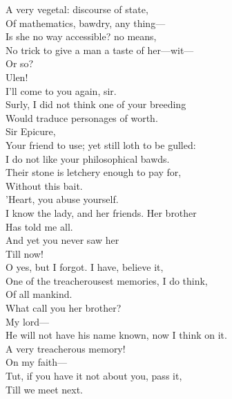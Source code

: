 \documentclass[a4paper,oneside,12pt]{memoir}
\begin{document}
\begin{drama*}
A very vegetal: discourse of state,\\
Of mathematics, bawdry, any thing---\\
\mammonspeaks Is she no way accessible? no means,\\
No trick to give a man a taste of her---wit---\\
Or so?\\
\subtlespeaks {}  Ulen!\\
\facespeaks {} I'll come to you again, sir.\\
\mammonspeaks Surly, I did not think one of your breeding\\
Would traduce personages of worth.\\
\surlyspeaks {} Sir Epicure,\\
Your friend to use; yet still loth to be gulled:\\
I do not like your philosophical bawds.\\
Their stone is letchery enough to pay for,\\
Without this bait.\\
\mammonspeaks {} 'Heart, you abuse yourself.\\
I know the lady, and her friends. Her brother\\
Has told me all.\\
\surlyspeaks {} And yet you never saw her\\
Till now!\\
\mammonspeaks {} O yes, but I forgot. I have, believe it,\\
One of the treacherousest memories, I do think,\\
Of all mankind.\\
\surlyspeaks {} What call you her brother?\\
\mammonspeaks {} My lord---\\
He will not have his name known, now I think on it.\\
\surlyspeaks A very treacherous memory!\\
\mammonspeaks {} On my faith---\\
\surlyspeaks Tut, if you have it not about you, pass it,\\
Till we meet next.\\

\end{drama*}
\end{document}
